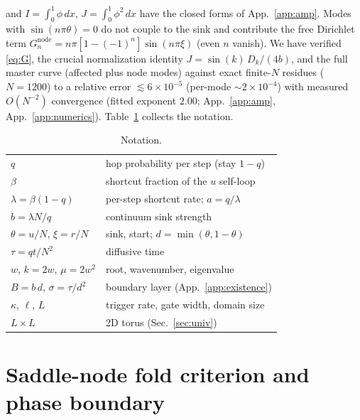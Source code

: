 \documentclass[reprint,amsmath,amssymb,aps,prresearch,longbibliography]{revtex4-2}
\begin{document}
and $I=\int_0^1\phi\,dx$, $J=\int_0^1\phi^2\,dx$ have the closed forms of App.~\ref{app:amp}. Modes with
$\sin(n\pi\theta)=0$ do not couple to the sink and contribute the free Dirichlet term
$G_n^{\mathrm{node}}=n\pi[1-(-1)^n]\sin(n\pi\xi)$ (even $n$ vanish). We have verified \eqref{eq:G}, the
crucial normalization identity $J=\sin(k)\,D_k/(4b)$, and the full master curve (affected plus node
modes) against exact finite-$N$ residues ($N=1200$) to a relative error $\lesssim6\times10^{-5}$ (per-mode
$\sim2\times10^{-4}$) with measured $O(N^{-2})$ convergence (fitted exponent $2.00$;
App.~\ref{app:amp}, App.~\ref{app:numerics}). Table~\ref{tab:notation} collects the notation.

\begin{table}[b]
\caption{\label{tab:notation}Notation.}
\begin{ruledtabular}
\begin{tabular}{ll}
$q$ & hop probability per step (stay $1-q$)\\
$\beta$ & shortcut fraction of the $u$ self-loop\\
$\lambda=\beta(1-q)$ & per-step shortcut rate; $a=q/\lambda$\\
$b=\lambda N/q$ & continuum sink strength\\
$\theta=u/N$, $\xi=r/N$ & sink, start; $d=\min(\theta,1-\theta)$\\
$\tau=qt/N^2$ & diffusive time\\
$w$, $k=2w$, $\mu=2w^2$ & root, wavenumber, eigenvalue\\
$B=b\,d$, $\sigma=\tau/d^2$ & boundary layer (App.~\ref{app:existence})\\
$\kappa$, $\ell$, $L$ & trigger rate, gate width, domain size\\
$L\times L$ & 2D torus (Sec.~\ref{sec:univ})\\
\end{tabular}
\end{ruledtabular}
\end{table}

\section{Saddle-node fold criterion and phase boundary}\label{sec:existence}
\end{document}
